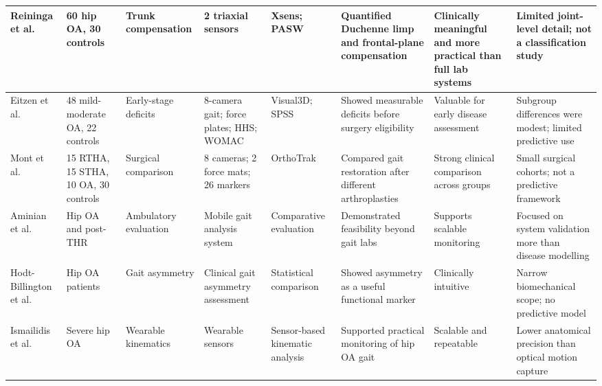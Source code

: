 \documentclass[12pt]{elsarticle}
\begin{document}
{\begin{longtable}{p{1.9cm} p{1.6cm} p{1.9cm} p{1.9cm} p{1.7cm} p{1.9cm} p{2.0cm} p{3.0cm}}
Reininga et al. \cite{reininga2012subjects}
& 60 hip OA, 30 controls
& Trunk compensation
& 2 triaxial sensors
& Xsens; PASW
& Quantified Duchenne limp and frontal-plane compensation
& Clinically meaningful and more practical than full lab systems
& Limited joint-level detail; not a classification study \\
\hline

Eitzen et al. \cite{eitzen2012sagittal}
& 48 mild-moderate OA, 22 controls
& Early-stage deficits
& 8-camera gait; force plates; HHS; WOMAC
& Visual3D; SPSS
& Showed measurable deficits before surgery eligibility
& Valuable for early disease assessment
& Subgroup differences were modest; limited predictive use \\
\hline

Mont et al. \cite{mont2007gait}
& 15 RTHA, 15 STHA, 10 OA, 30 controls
& Surgical comparison
& 8 cameras; 2 force mats; 26 markers
& OrthoTrak
& Compared gait restoration after different arthroplasties
& Strong clinical comparison across groups
& Small surgical cohorts; not a predictive framework \\
\hline

Aminian et al. \cite{aminian2004evaluation}
& Hip OA and post-THR
& Ambulatory evaluation
& Mobile gait analysis system
& Comparative evaluation
& Demonstrated feasibility beyond gait labs
& Supports scalable monitoring
& Focused on system validation more than disease modelling \\
\hline

Hodt-Billington et al. \cite{hodt2012criteria}
& Hip OA patients
& Gait asymmetry
& Clinical gait asymmetry assessment
& Statistical comparison
& Showed asymmetry as a useful functional marker
& Clinically intuitive
& Narrow biomechanical scope; no predictive model \\
\hline

Ismailidis et al. \cite{ismailidis2020measuring}
& Severe hip OA
& Wearable kinematics
& Wearable sensors
& Sensor-based kinematic analysis
& Supported practical monitoring of hip OA gait
& Scalable and repeatable
& Lower anatomical precision than optical motion capture \\
\hline

\end{longtable}
}
\end{document}
